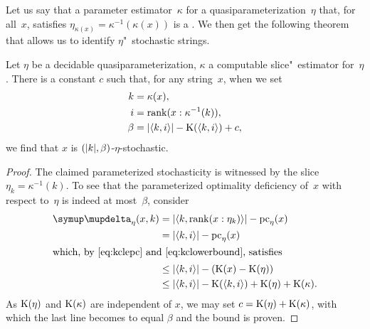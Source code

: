 Let us say that a parameter estimator~$\kappa$ for a quasiparameterization~$\eta$ that, for all~$x$, satisfies $\eta_{\kappa(x)} = \kappa^{-1}(\kappa(x))$ is a .
We then get the following theorem that allows us to identify $\eta$"~stochastic strings.
\begin{theorem}
\label{thm:etastochastic}%
  Let $\eta$ be a decidable quasiparameterization, $\kappa$ a computable slice"~estimator for~$\eta$.
  There is a constant $c$ such that, for any string~$x$, when we set
  \begin{align*}
    k &= \kappa(x), \\
    i &= \operatorname{rank}(x : \kappa^{-1}(k)), \\
    \beta &= {\lvert{\langle k, i\rangle}\rvert} - \operatorname{K}({\langle k, i\rangle}) + c,
  \end{align*}
  we find that $x$ is $({\lvert k\rvert}, \beta)$-$\eta$-stochastic.
\end{theorem}
\begin{proof}
  The claimed parameterized stochasticity is witnessed by the slice $\eta_k = \kappa^{-1}(k)$.
  To see that the parameterized optimality deficiency of~$x$ with respect to~$\eta$ is indeed at most~$\beta$, consider
  \begin{align*}
    \updelta_\eta(x, k) &= \length{\pair{k}{\rank(x : \eta_k)}} - \pc_\eta(x) \\
      &= \length{\pair{k}{i}} - \pc_\eta(x) \\
    \intertext{which, by~\eqref{eq:kclepc} and~\eqref{eq:kclowerbound}, satisfies}
      &\le \length{\pair{k}{i}} - (\KC(x) - \KC(\eta)) \\
      &\le \length{\pair{k}{i}} - \KC(\pair{k}{i}) + \KC(\eta) + \KC(\kappa).
  \end{align*}
  As $\operatorname{K}(\eta)$ and $\operatorname{K}(\kappa)$ are independent of $x$, we may set $c = \operatorname{K}(\eta) + \operatorname{K}(\kappa)$, with which the last line becomes to equal $\beta$ and the bound is proven.
\end{proof}

